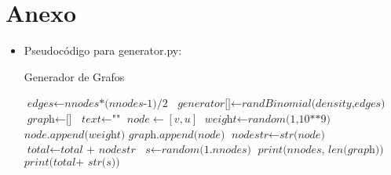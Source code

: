 \documentclass[11pt]{article}
\begin{document}
\newpage
\section{Anexo}

\begin{itemize}
    \item Pseudocódigo para generator.py:
    \begin{algorithm}
    \caption{Generador de Grafos}
    \label{alg:generator}
    \begin{algorithmic}[1]
    \State $\textit{edges} \gets \textit{nnodes*(nnodes-1)/2}$
    \State $\textit{generator[]} \gets \textit{randBinomial(density,edges)}$
    \State $\textit{graph} \gets \textit{[]} $
    \State $\textit{text} \gets \textit{""} $
            \State $\textit{node} \gets [v,u] $
                \State $\textit{weight} \gets \textit{random(1,10**9)}$
                \State $\textit{node.append(weight)}$
                \State $\textit{graph.append(node)}$
                \State $\textit{nodestr} \gets \textit{str(node)}$
                \State $\textit{total} \gets \textit{total + nodestr} $
            \EndIf
        \EndFor
    \EndFor
    \State $\textit{s} \gets \textit{random(1.nnodes)} $
    \State $\textit{print(nnodes, len(graph))}$
    \State $\textit{print(total+ str(s))}$
    \EndProcedure
    \end{algorithmic}
    \end{algorithm}
\end{itemize}
\end{document}
